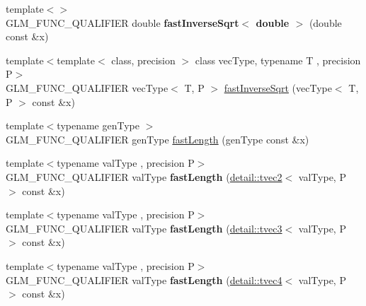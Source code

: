\begin{DoxyCompactItemize}
\item 
\hypertarget{namespaceglm_aac78c01dd432421901cd0ae70ad5cc7b}{{\footnotesize template$<$$>$ }\\G\-L\-M\-\_\-\-F\-U\-N\-C\-\_\-\-Q\-U\-A\-L\-I\-F\-I\-E\-R double {\bfseries fast\-Inverse\-Sqrt$<$ double $>$} (double const \&x)}\label{namespaceglm_aac78c01dd432421901cd0ae70ad5cc7b}

\item 
{\footnotesize template$<$template$<$ class, precision $>$ class vec\-Type, typename T , precision P$>$ }\\G\-L\-M\-\_\-\-F\-U\-N\-C\-\_\-\-Q\-U\-A\-L\-I\-F\-I\-E\-R vec\-Type$<$ T, P $>$ \hyperlink{group__gtx__fast__square__root_ga903878071f92e51e551791e584a171a1}{fast\-Inverse\-Sqrt} (vec\-Type$<$ T, P $>$ const \&x)
\item 
{\footnotesize template$<$typename gen\-Type $>$ }\\G\-L\-M\-\_\-\-F\-U\-N\-C\-\_\-\-Q\-U\-A\-L\-I\-F\-I\-E\-R gen\-Type \hyperlink{group__gtx__fast__square__root_ga70aa3c80d8bb22e021c6c3ebdcf8e3ee}{fast\-Length} (gen\-Type const \&x)
\item 
\hypertarget{namespaceglm_a37a797293ad5fb1be42bac6e9bc93954}{{\footnotesize template$<$typename val\-Type , precision P$>$ }\\G\-L\-M\-\_\-\-F\-U\-N\-C\-\_\-\-Q\-U\-A\-L\-I\-F\-I\-E\-R val\-Type {\bfseries fast\-Length} (\hyperlink{structglm_1_1detail_1_1tvec2}{detail\-::tvec2}$<$ val\-Type, P $>$ const \&x)}\label{namespaceglm_a37a797293ad5fb1be42bac6e9bc93954}

\item 
\hypertarget{namespaceglm_aa0d5ca1b5137d3ac5fd2540e64bbd392}{{\footnotesize template$<$typename val\-Type , precision P$>$ }\\G\-L\-M\-\_\-\-F\-U\-N\-C\-\_\-\-Q\-U\-A\-L\-I\-F\-I\-E\-R val\-Type {\bfseries fast\-Length} (\hyperlink{structglm_1_1detail_1_1tvec3}{detail\-::tvec3}$<$ val\-Type, P $>$ const \&x)}\label{namespaceglm_aa0d5ca1b5137d3ac5fd2540e64bbd392}

\item 
\hypertarget{namespaceglm_af2f50a91884f2201588d4cef66dd7ff0}{{\footnotesize template$<$typename val\-Type , precision P$>$ }\\G\-L\-M\-\_\-\-F\-U\-N\-C\-\_\-\-Q\-U\-A\-L\-I\-F\-I\-E\-R val\-Type {\bfseries fast\-Length} (\hyperlink{structglm_1_1detail_1_1tvec4}{detail\-::tvec4}$<$ val\-Type, P $>$ const \&x)}\label{namespaceglm_af2f50a91884f2201588d4cef66dd7ff0}


\end{DoxyCompactItemize}
